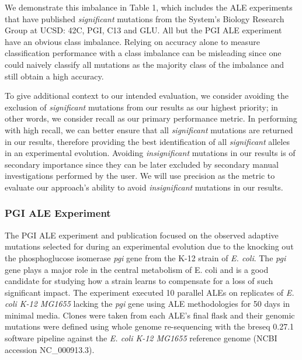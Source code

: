 \documentclass[12pt,final,masters,chapterheads]{ucsd}  %
\begin{document}
We demonstrate this imbalance in Table 1, which includes the ALE experiments that have published \textit{significant} mutations from the System's Biology Research Group at UCSD: 42C, PGI, C13 and GLU. All but the PGI ALE experiment have an obvious class imbalance. Relying on accuracy alone to measure classification performance with a class imbalance can be misleading since one could naively classify all mutations as the majority class of the imbalance and still obtain a high accuracy.

To give additional context to our intended evaluation, we consider avoiding the exclusion of \textit{significant} mutations from our results as our highest priority; in other words, we consider recall as our primary performance metric. In performing with high recall, we can better ensure that all \textit{significant} mutations are returned in our results, therefore providing the best identification of all \textit{significant} alleles in an experimental evolution. Avoiding \textit{insignificant} mutations in our results is of secondary importance since they can be later excluded by secondary manual investigations performed by the user. We will use precision as the metric to evaluate our approach's ability to avoid \textit{insignificant} mutations in our results.

\subsubsection{PGI ALE Experiment}
%
%
The PGI ALE experiment and publication focused on the observed adaptive mutations selected for during an experimental evolution due to the knocking out the phosphoglucose isomerase \textit{pgi} gene from the K-12 strain of \textit{E. coli}. The \textit{pgi} gene plays a major role in the central metabolism of E. coli and is a good candidate for studying how a strain learns to compensate for a loss of such significant impact. The experiment executed 10 parallel ALEs on replicates of \textit{E. coli K-12 MG1655} lacking the \textit{pgi} gene using ALE methodologies for 50 days in minimal media. Clones were taken from each ALE's final flask and their genomic mutations were defined using whole genome re-sequencing with the breseq 0.27.1 software pipeline against the \textit{E. coli K-12 MG1655} reference genome (NCBI accession NC\_000913.3).
%
%
%
%
\end{document}

